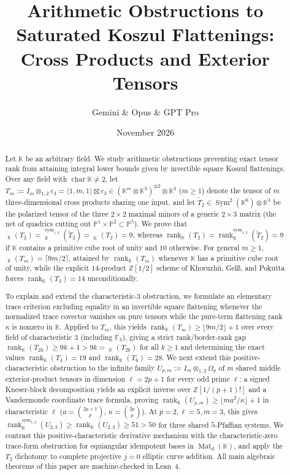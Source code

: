 \documentclass[11pt,reqno]{amsart}
\title[Arithmetic Obstructions to Saturated Koszul Flattenings]{Arithmetic Obstructions to Saturated Koszul Flattenings: Cross Products and Exterior Tensors}
\author{Gemini \& Opus \& GPT Pro}
\date{November 2026}
\theoremstyle{definition}
\theoremstyle{remark}
\numberwithin{equation}{section}
\newcommand{\FF}{\mathbb{F}}
\newcommand{\KK}{\mathbb{K}}
\newcommand{\ZZ}{\mathbb{Z}}
\newcommand{\PP}{\mathbb{P}}
\DeclareMathOperator{\rk}{rank}
\DeclareMathOperator{\brk}{\underline{rank}}
\DeclareMathOperator{\Sym}{Sym}
\DeclareMathOperator{\Mat}{Mat}
\DeclareMathOperator{\chr}{char}
\begin{document}
\begin{abstract}
Let $\KK$ be an arbitrary field. We study arithmetic obstructions preventing exact tensor rank from attaining integral lower bounds given by invertible square Koszul flattenings. Over any field with $\chr\KK \neq 2$, let $T_m := I_m \otimes_{1,2} \varepsilon_3 = \langle 1, m, 1 \rangle \boxtimes \varepsilon_3 \in (\KK^m \otimes \KK^3)^{\otimes 2} \otimes \KK^3$ ($m \ge 1$) denote the tensor of $m$ three-dimensional cross products sharing one input, and let $\widetilde{T}_2 \in \Sym^2(\KK^6) \otimes \KK^3$ be the polarized tensor of the three $2 \times 2$ maximal minors of a generic $2 \times 3$ matrix (the net of quadrics cutting out $\PP^1 \times \PP^2 \subset \PP^5$). We prove that $\brk_{\KK}(T_2) = \brk_{\KK}^{\mathrm{sym}_{1,2}}(\widetilde{T}_2) = \brk_{\overline{\KK}}(T_2) = 9$, whereas $\rk_{\KK}(T_2) = \rk_{\KK}^{\mathrm{sym}_{1,2}}(\widetilde{T}_2) = 9$ if $\KK$ contains a primitive cube root of unity and $10$ otherwise. For general $m \ge 1$, $\brk_{\KK}(T_m) = \lceil 9m/2 \rceil$, attained by $\rk_{\KK}(T_m)$ whenever $\KK$ has a primitive cube root of unity, while the explicit $14$-product $\ZZ[1/2]$ scheme of Khoruzhii, Gel\ss, and Pokutta forces $\rk_{\KK}(T_3) = 14$ unconditionally.

To explain and extend the characteristic-$3$ obstruction, we formulate an elementary trace criterion excluding equality in an invertible square flattening whenever the normalized trace covector vanishes on pure tensors while the pure-term flattening rank $\kappa$ is nonzero in $\KK$. Applied to $T_m$, this yields $\rk_{\KK}(T_m) \ge \lfloor 9m/2 \rfloor + 1$ over every field of characteristic $3$ (including $\overline{\FF}_3$), giving a strict rank/border-rank gap $\rk_{\KK}(T_{2k}) \ge 9k + 1 > 9k = \brk_{\KK}(T_{2k})$ for all $k \ge 1$ and determining the exact values $\rk_{\KK}(T_4) = 19$ and $\rk_{\KK}(T_6) = 28$. We next extend this positive-characteristic obstruction to the infinite family $U_{p,m} := I_m \otimes_{1,2} \Omega_p$ of $m$ shared middle exterior-product tensors in dimension $\ell = 2p + 1$ for every odd prime $\ell$: a signed Kneser-block decomposition yields an explicit inverse over $\ZZ[1/(p+1)!]$ and a Vandermonde coordinate trace formula, proving $\rk_{\KK}(U_{p,m}) \ge \lfloor m a^2 / \kappa \rfloor + 1$ in characteristic $\ell$ ($a = \binom{2p+1}{p}$, $\kappa = \binom{2p}{p}$). At $p = 2, \ell = 5, m = 3$, this gives $\rk_{\KK}^{\mathrm{sym}_{1,2}}(U_{2,3}) \ge \rk_{\KK}(U_{2,3}) \ge 51 > 50$ for three shared $5$-Pfaffian systems. We contrast this positive-characteristic derivative mechanism with the characteristic-zero trace-form obstruction for equiangular idempotent bases in $\Mat_d(\KK)$, and apply the $T_2$ dichotomy to complete projective $j = 0$ elliptic curve addition. All main algebraic theorems of this paper are machine-checked in Lean~4.
\end{abstract}
\end{document}
